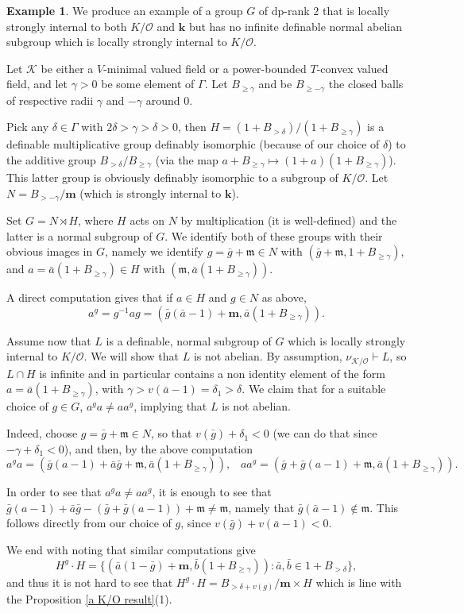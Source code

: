 \documentclass[11pt]{amsart}
\theoremstyle{definition}
\newtheorem{example}[theorem]{Example}
\newcommand{\m}{\textbf{m}}
\newcommand{\bk}{\textbf{k}}
\newcommand{\CK}{{\mathcal K}}
\newcommand{\CO}{{\mathcal O}}
\newcommand{\0}{\emptyset}
\def\bm{\mathfrak m}
\begin{document}
\begin{example}
We produce an example of a group $G$ of dp-rank $2$ that is locally strongly internal to both $K/\CO$ and  $\bk$ but has no infinite definable normal abelian subgroup 
which is locally strongly internal to $K/\CO$.

    Let $\CK$ be either a $V$-minimal valued field or a power-bounded $T$-convex valued field, and let $\gamma>0$ be some element of $\Gamma$. Let $B_{\geq \gamma}$ and be $B_{\geq -\gamma}$ the closed balls of respective radii $\gamma$ and $-\gamma$ around $0$. 
    
    Pick any $\delta\in \Gamma$ with $2\delta>\gamma>\delta>0$, then $H=(1+B_{>\delta})/(1+B_{\geq \gamma})$ is a definable multiplicative group definably isomorphic (because of our choice of $\delta$)  to the additive group $B_{>\delta}/B_{\geq \gamma}$ (via the map $a+B_{\geq \gamma}\mapsto (1+a)(1+B_{\geq \gamma})$). This latter group is obviously definably isomorphic to a subgroup of $K/\CO$. Let $N=B_{>-\gamma}/\m$  (which is strongly internal to $\bk$).

    Set $G=N\rtimes H$, where $H$ acts on $N$ by multiplication (it is well-defined) and the latter is a normal subgroup of $G$. We identify both of these groups with their obvious images in $G$, namely we identify $g=\bar g+\bm\in N$ with $(\bar g+\bm,1+B_{\geq \gamma})$, and $a=\bar a(1+B_{\geq \gamma})\in H$ with $(\bm,\bar a(1+B_{\geq \gamma}))$.

    A direct computation gives that if $a\in H$ and $g\in N$ as above,  $$a^g=g^{-1}ag=(\bar g(\bar a-1)+\m,\bar a(1+B_{\geq \gamma})).$$ 
    
  Assume now that $L$ is a definable, normal subgroup of $G$ which is locally strongly internal to $K/\CO$. We will show that $L$ is not abelian.  By assumption,  $\nu_{\CK/\CO}\vdash L$, so $L\cap H$ is infinite and in particular contains a non identity element of the form $a=\bar a(1+B_{\geq \gamma})$, with $\gamma>v(\bar a-1)=\delta_1>\delta$. We claim that for a suitable choice of $g\in G$, $a^ga\neq aa^g$, implying that $L$ is not abelian.

  Indeed, choose $g=\bar g+\bm\in N$, so that $v(\bar g)+\delta_1<0$ (we can do that since $-\gamma+\delta_1<0$), and then, by the above computation
  $$a^ga=(\bar g(a-1)+\bar a \bar g+\bm, \bar a(1+B_{\geq \gamma})),\,\,\,\,\,  aa^g=(\bar g+\bar g(a-1)+\bm, \bar a(1+B_{\geq \gamma})).$$

  In order to see that $a^ga\neq aa^g$, it is enough to see that $\bar g(a-1)+\bar a\bar g-(\bar g +\bar g(a-1))+\bm \neq \bm$, namely that $\bar g(\bar a-1)\notin \bm$. This follows directly from our choice of $g$, since $v(\bar g)+v(\bar a-1)<0$. 


    We end with noting that similar computations give \[H^g\cdot H=\{(\bar a(1-\bar g)+\m,\bar b(1+B_{\geq \gamma})):\bar a,\bar b\in 1+B_{>\delta}\},\] and thus it is not hard to see that  $H^g\cdot H=B_{>\delta+v(g)}/\m\times H$ which is line with the Proposition \ref{a K/O result}(1).
\end{example} 
\end{document}
